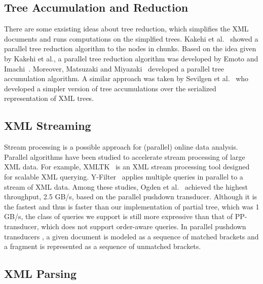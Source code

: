 \subsection{Tree Accumulation and Reduction}

There are some exsisting ideas about tree reduction, which simplifies the XML
documents and runs computations on the simplfied trees. Kakehi et
al.~\cite{KaME07} showed a parallel tree reduction algorithm to the nodes in
chunks. Based on the idea given by Kakehi et al., a parallel tree reduction
algorithm was developed by Emoto and Imachi~\cite{EmIm12}. Moreover, Matsuzaki
and Miyazaki~\cite{MaMi16} developed a parallel tree accumulation algorithm. A
similar approach was taken by Sevilgen et al.~\cite{SAFu05} who developed a
simpler version of tree accumulations over the serialized representation of XML
trees.

\subsection{XML Streaming}

Stream processing is a possible approach for (parallel) online data analysis.
Parallel algorithms have been studied to accelerate stream processing of large
XML data. For example, XMLTK~\cite{AGGR02} is an XML stream processing tool
designed for scalable XML querying. Y-Filter~\cite{ZhPC10} applies multiple
queries in parallel to a stream of XML data. Among these studies, Ogden et
al.~\cite{OgTP13} achieved the highest throughput, 2.5 GB/s, based on the
parallel pushdown transducer. Although it is the fastest and thus is faster than
our implementation of partial tree, which was 1 GB/s, the class of queries we
support is still more expressive than that of PP-transducer, which does not
support order-aware queries. In parallel pushdown transducers \cite{LiZZ17}, a
given document is modeled as a sequence of matched brackets and a fragment is
represented as a sequence of unmatched brackets.

\subsection{XML Parsing}

